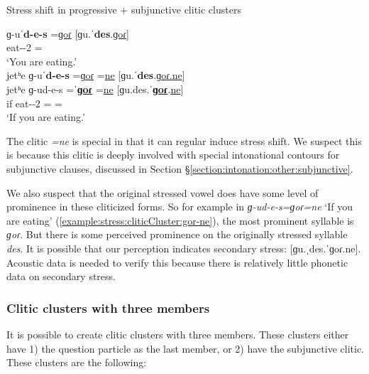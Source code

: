 \begin{exe}
	\ex Stress shift in progressive  + subjunctive clitic clusters \label{example:stress:cliticCluster:ProgSubj}
	\begin{xlist}
		\ex \gll   ɡ-uˈ\textbf{d-e-s} =\underline{ɡoɾ}  [ɡu.ˈ\textbf{des}.\underline{ɡoɾ}]
		\\
		eat-{\thgloss}-2{\sg} =\underline{{\prog}}
		\\
		\trans `You are eating.'
		\\
		\ex \glll  jetʰe  ɡ-uˈ\textbf{d-e-s} =\underline{ɡoɾ}  =\underline{ne}  [ɡu.ˈ\textbf{des}.\underline{ɡoɾ.ne}]
		\\
		jetʰe ɡ-ud-e-s   =ˈ\underline{\textbf{ɡoɾ}} =\underline{ne}  [ɡu.des.ˈ\textbf{\underline{ɡoɾ}}.\underline{ne}]
		\\
		if eat-{\thgloss}-2{\sg} =\underline{{\prog}} =\underline{{\sbjv}}
		\\
		\trans `If you are eating.'\label{example:stress:cliticCluster:gor-ne}
		\\
	\end{xlist}
\end{exe}

The clitic \textit{=ne} is special in that it can regular induce stress shift. We suspect this is because this clitic is deeply involved with special intonational contours for subjunctive clauses, discussed in Section \S\ref{section:intonation:other:subjunctive}. 

We also suspect that the original stressed vowel does have some level of prominence in these cliticized forms. So for example in \textit{ɡ-ud-e-s=ɡoɾ=ne} `If you are eating' (\ref{example:stress:cliticCluster:gor-ne}), the most prominent syllable is \textit{ɡoɾ}. But there is some perceived prominence on the originally stressed syllable \textit{des}. It is possible that our perception indicates secondary stress: [ɡu.ˌdes.ˈɡoɾ.ne]. Acoustic data is needed to verify this because there is relatively little phonetic data on secondary stress. 

\subsubsection{Clitic clusters with three members}\label{section:stress:cliticc:cluster:Three}
It is possible to create clitic clusters with three members. These clusters either have 1) the question particle as the last member, or 2) have the subjunctive clitic. These clusters are the following:

